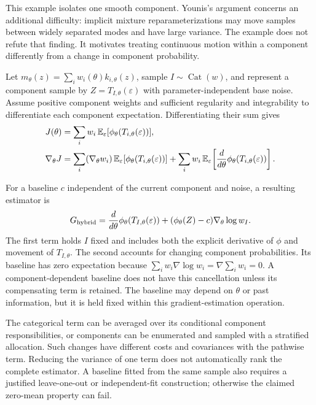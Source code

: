 This example isolates one smooth component. Younis's argument concerns an
additional difficulty: implicit mixture reparameterizations may move samples
between widely separated modes and have large variance. The example does
not refute that finding. It motivates treating continuous motion within a
component differently from a change in component probability.

\begin{samepage}
Let $m_\theta(z)=\sum_iw_i(\theta)k_{i,\theta}(z)$, sample
$I\sim\operatorname{Cat}(w)$, and represent a component sample by
$Z=T_{I,\theta}(\varepsilon)$ with parameter-independent base noise.
Assume positive component weights and sufficient regularity and integrability
to differentiate each component expectation. Differentiating their sum gives
\begin{align}
 J(\theta)&=\sum_iw_i\,
             \mathbb E_\varepsilon[\phi_\theta(T_{i,\theta}(\varepsilon))],
 \notag\\
 \nabla_\theta J
 &=\sum_i(\nabla_\theta w_i)\,
             \mathbb E_\varepsilon[\phi_\theta(T_{i,\theta}(\varepsilon))]
   +\sum_iw_i\,
             \mathbb E_\varepsilon\!\left[
                 \frac{d}{d\theta}\phi_\theta(T_{i,\theta}(\varepsilon))
             \right].
 \label{eq:hybrid-component-derivation}
\end{align}
\end{samepage}
For a baseline $c$ independent of the current component and noise, a resulting
estimator is
\begin{equation}
 G_{\rm hybrid}
 =\frac{d}{d\theta}\phi_\theta(T_{I,\theta}(\varepsilon))
  +(\phi_\theta(Z)-c)\nabla_\theta\log w_I.
 \label{eq:hybrid-estimator}
\end{equation}
The first term holds $I$ fixed and includes both the explicit derivative of
$\phi$ and movement of $T_{I,\theta}$. The second accounts for changing
component probabilities. Its baseline has zero expectation because
$\sum_iw_i\nabla\log w_i=\nabla\sum_iw_i=0$. A component-dependent baseline
does not have this cancellation unless its compensating term is retained.
The baseline may depend on $\theta$ or past information, but it is held fixed
within this gradient-estimation operation.

The categorical term can be averaged over its conditional component
responsibilities, or components can be enumerated and sampled with a
stratified allocation. Such changes have different costs and covariances with
the pathwise term. Reducing the variance of one term does not automatically
rank the complete estimator. A baseline fitted from the same sample also
requires a justified leave-one-out or independent-fit construction; otherwise
the claimed zero-mean property can fail.

